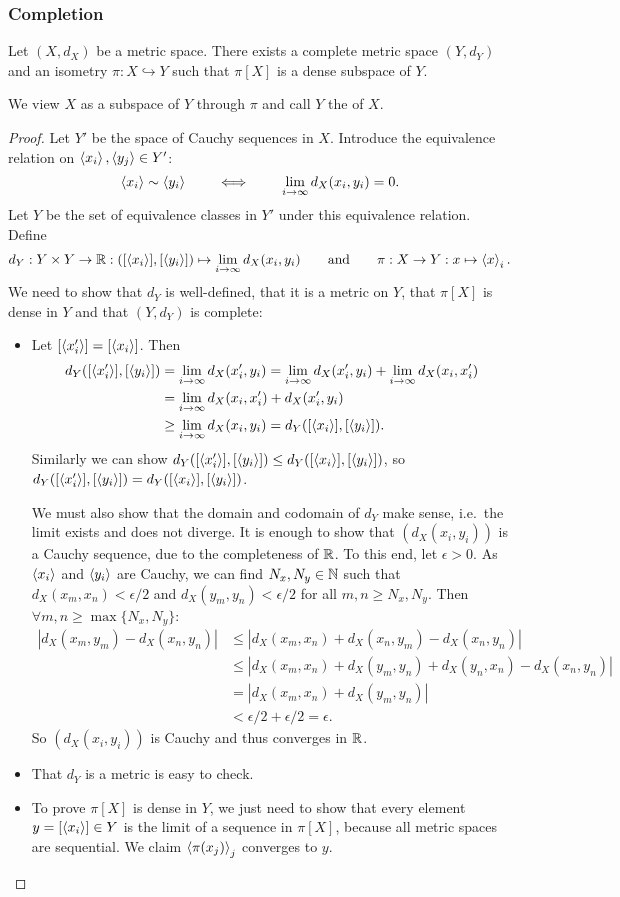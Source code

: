 \subsubsection{Completion}
\begin{proposition}
Let $(X,d_X)$ be a metric space. There exists a complete metric space $(Y,d_Y)$ and an isometry $\pi:X\hookrightarrow Y$ such that $\pi[X]$ is a dense subspace of $Y$.
\end{proposition}
We view $X$ as a subspace of $Y$ through $\pi$ and call $Y$ the  of $X$.
\begin{proof}
Let $Y'$ be the space of Cauchy sequences in $X$. Introduce the equivalence relation on $\left\langle x_i \right\rangle,\left\langle y_j \right\rangle\in Y'$:
\[ \left\langle x_i \right\rangle \sim \left\langle y_i \right\rangle \qquad \iff\qquad \lim_{i\to\infty} d_X(x_i,y_i) = 0. \]
Let $Y$ be the set of equivalence classes in $Y'$ under this equivalence relation. Define
\[ d_Y: Y\times Y\to \mathbb{R}: ([\left\langle x_i \right\rangle],[\left\langle y_i \right\rangle]) \mapsto \lim_{i\to\infty}d_X(x_i,y_i) \qquad\text{and}\qquad \pi: X\to Y: x\mapsto \left\langle x \right\rangle_i. \]
We need to show that $d_Y$ is well-defined, that it is a metric on $Y$, that $\pi[X]$ is dense in $Y$ and that $(Y,d_Y)$ is complete:
\begin{itemize}
\item Let $[\left\langle x_i' \right\rangle] = [\left\langle x_i \right\rangle]$. Then
\begin{align*}
d_Y([\left\langle x_i' \right\rangle],[\left\langle y_i \right\rangle]) &= \lim_{i\to\infty}d_X(x'_i,y_i) = \lim_{i\to\infty}d_X(x'_i,y_i) + \lim_{i\to\infty}d_X(x_i,x'_i) \\
&= \lim_{i\to\infty}d_X(x_i,x_i')+d_X(x'_i,y_i) \\
&\geq \lim_{i\to\infty}d_X(x_i,y_i) = d_Y([\left\langle x_i \right\rangle],[\left\langle y_i \right\rangle]).
\end{align*}
Similarly we can show $d_Y([\left\langle x_i' \right\rangle],[\left\langle y_i \right\rangle])\leq d_Y([\left\langle x_i \right\rangle],[\left\langle y_i \right\rangle])$, so $d_Y([\left\langle x'_i \right\rangle],[\left\langle y_i \right\rangle]) = d_Y([\left\langle x_i \right\rangle],[\left\langle y_i \right\rangle])$.

We must also show that the domain and codomain of $d_Y$ make sense, i.e.\ the limit exists and does not diverge. It is enough to show that $(d_X(x_i,y_i))$ is a Cauchy sequence, due to the completeness of $\mathbb{R}$. To this end, let $\epsilon>0$. As $\left\langle x_i \right\rangle$ and $\left\langle y_i \right\rangle$ are Cauchy, we can find $N_x,N_y\in\mathbb{N}$ such that $d_X(x_m,x_n)< \epsilon/2$ and $d_X(y_m,y_n) < \epsilon/2$ for all $m,n \geq N_x,N_y$. Then $\forall m,n \geq \max\{N_x,N_y\}$:
\begin{align*}
|d_X(x_m,y_m) - d_X(x_n,y_n)| &\leq |d_X(x_m,x_n)+d_X(x_n,y_m) - d_X(x_n,y_n)| \\
&\leq |d_X(x_m,x_n)+d_X(y_m,y_n)+ d_X(y_n,x_n) - d_X(x_n,y_n)| \\
&= |d_X(x_m,x_n)+d_X(y_m,y_n)| \\
&< \epsilon/2 + \epsilon/2= \epsilon.
\end{align*}
So $(d_X(x_i,y_i))$ is Cauchy and thus converges in $\mathbb{R}$.
\item That $d_Y$ is a metric is easy to check.
\item To prove $\pi[X]$ is dense in $Y$, we just need to show that every element $y = [\left\langle x_i \right\rangle]\in Y$ is the limit of a sequence in $\pi[X]$, because all metric spaces are sequential. We claim $\left\langle \pi(x_j) \right\rangle_j$ converges to $y$.


\end{itemize}
\end{proof}
